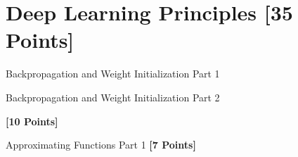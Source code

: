\newif\ifshowsolutions
\showsolutionstrue







\pagestyle{fancy}




\newpage
\section{Deep Learning Principles [35 Points]}

\begin{problem}[5]
  Backpropagation and Weight Initialization Part 1
\end{problem}

\begin{subsolution}

\end{subsolution}

\newpage

\begin{problem}[5]
  Backpropagation and Weight Initialization Part 2
\end{problem}

\begin{subsolution}

\end{subsolution}

\newpage


\problem \textbf{[10 Points]}


\begin{solution}

\end{solution}

\newpage




\problem Approximating Functions Part 1 \textbf{[7 Points]}

\begin{subsolution}

\end{subsolution}

